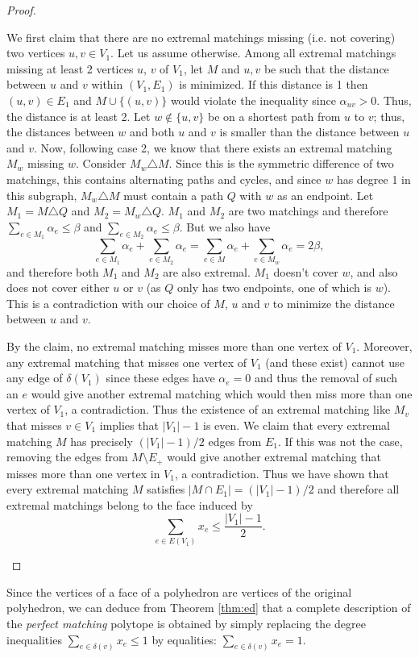 \documentclass[12pt]{article}
\begin{document}
\begin{proof}
\begin{enumerate}
	We first claim that there are no extremal matchings missing (i.e. not covering) two vertices $u,v\in V_1$. Let us assume otherwise.  Among all extremal matchings missing at least 2 vertices $u$, $v$ of $V_1$, let  $M$ and $u, v$ be such that the distance between $u$ and $v$ within $(V_1,E_1)$ is minimized. If this distance is 1 then $(u,v)\in E_1$ and $M\cup \{(u,v)\}$  would violate the inequality since $\alpha_{uv}>0$. Thus, the distance is at least 2. Let $w\notin\{u,v\}$ be on a shortest path from $u$ to $v$; thus, the distances between $w$ and both $u$ and $v$ is smaller than the distance between $u$ and $v$. Now, following case 2, we know that there exists an extremal matching $M_w$ missing $w$. Consider $M_w\triangle M$. Since this is the symmetric difference of two matchings, this contains alternating paths and cycles, and since $w$ has degree 1 in this subgraph, $M_w\triangle M$ must contain a path $Q$ with $w$ as an endpoint. Let $M_1=M\triangle Q$ and $M_2=M_w\triangle Q$. $M_1$ and $M_2$ are two matchings and therefore $\sum_{e\in M_1} \alpha_e\leq \beta$ and $\sum_{e\in M_2} \alpha_e \leq \beta$. But we also have $$
	\sum_{e\in M_1} \alpha_e + \sum_{e\in M_2} \alpha_e = \sum_{e\in M} \alpha_e + \sum_{e\in M_w} \alpha_e = 2\beta,$$ and therefore both $M_1$ and $M_2$ are also extremal. $M_1$ doesn't cover $w$, and also does not cover either $u$ or $v$ (as $Q$ only has two endpoints, one of which is $w$). This is a contradiction with our choice of $M$, $u$ and $v$ to minimize the distance between $u$ and $v$. 
	
	By the claim, no extremal matching misses more than one vertex of $V_1$. Moreover, any extremal matching that misses one vertex of $V_1$ (and these exist) cannot use any edge of $\delta(V_1)$ since these edges have $\alpha_e=0$ and thus the removal of such an $e$ would give another extremal matching which would then miss more than one vertex of $V_1$, a contradiction. Thus the existence of  an extremal matching like $M_v$ that misses $v\in V_1$ implies that $|V_1|-1$ is even. We claim that every extremal matching $M$ has precisely $(|V_1|-1)/2$ edges from $E_1$. If this was not the case, removing the edges from $M\setminus E_+$ would give another extremal matching that misses more than one vertex in $V_1$, a contradiction. Thus we have shown that every extremal matching $M$ satisfies $|M\cap E_1|=(|V_1|-1)/2$ and therefore all extremal matchings belong to the face induced by
\[
\sum_{e\in E(V_1)} x_e \leq \frac{|V_1|-1}{2}.
\]
	
 \end{enumerate}
\end{proof}

Since the vertices of a face of a polyhedron are vertices of the original polyhedron, we can deduce from Theorem \ref{thm:ed} that a complete description of the {\it perfect matching} polytope is obtained by simply replacing the degree inequalities $\sum_{e\in \delta(v)} x_e \leq 1$ by equalities: $\sum_{e\in \delta(v)} x_e = 1$. 
\end{document}
